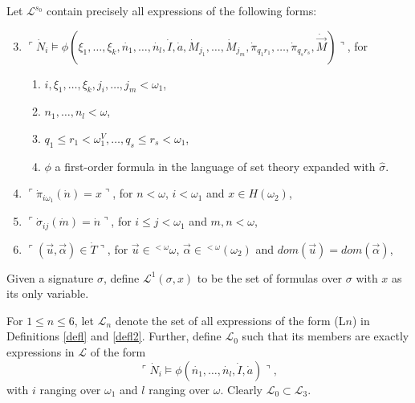 \documentclass[12pt]{article}
\numberwithin{equation}{section}
\begin{document}
\begin{defi}\label{def433}
Let $\mathcal{L}^{s_0}$ contain precisely all expressions of the following forms:
\begin{enumerate}[label=(L\arabic*), leftmargin=40pt]
    \setcounter{enumi}{2}
    \item\label{l3} $\ulcorner \dot{N}_i \models \phi(\xi_1, \ldots, \xi_k, \dot{n_1}, \ldots, \dot{n_l}, \dot{I}, \dot{a}, \dot{M}_{j_1}, \ldots, \dot{M}_{j_m}, \dot{\pi}_{q_{1}r_{1}}, \ldots, \dot{\pi}_{q_{s}r_{s}}, \dot{\Vec{M}}) \urcorner$, for 
    \begin{enumerate}[label=(\alph*), leftmargin=15pt]
        \item $i, \xi_1, \ldots, \xi_k, j_i, \ldots, j_m < \omega_1$,
        \item $n_1, \ldots, n_l < \omega$, 
        \item $q_1 \leq r_1 < \omega_1^V, \ldots, q_s \leq r_s < \omega_1$,
        \item $\phi$ a first-order formula in the language of set theory expanded with $\hat{\sigma}$.
    \end{enumerate}
    \item\label{l4} $\ulcorner \dot{\pi}_{i\omega_1}(\dot{n}) = x \urcorner$, for $n < \omega$, $i < \omega_1$ and $x \in H(\omega_2)$,
    \item\label{l6} $\ulcorner \dot{\sigma}_{ij}(\dot{m}) = \dot{n} \urcorner$, for $i \leq j < \omega_1$ and $m, n < \omega$, 
    \item\label{l7} $\ulcorner (\Vec{u}, \Vec{\alpha}) \in \dot{T} \urcorner$, for $\Vec{u} \in {^{<\omega}{\omega}}$, $\Vec{\alpha} \in {^{<\omega}{(\omega_2)}}$ and $dom(\Vec{u}) = dom(\Vec{\alpha})$,
\end{enumerate}
\end{defi}

\begin{defi}\label{defsvf}
Given a signature $\sigma$, define $\mathcal{L}^1(\sigma, x)$ to be the set of formulas over $\sigma$ with $x$ as its only variable.
\end{defi}

\begin{defi}\label{subn}
For $1 \leq n \leq 6$, let $\mathcal{L}_n$ denote the set of all expressions of the form (L$n$) in Definitions \ref{defl} and \ref{defl2}. Further, define $\mathcal{L}_0$ such that its members are exactly expressions in $\mathcal{L}$ of the form 
\begin{equation*}
    \ulcorner \dot{N}_i \models \phi(\dot{n_1}, \ldots, \dot{n_l}, \dot{I}, \dot{a}) \urcorner,
\end{equation*}
with $i$ ranging over $\omega_1$ and $l$ ranging over $\omega$. Clearly $\mathcal{L}_0 \subset \mathcal{L}_3$.
\end{defi}
\end{document}
